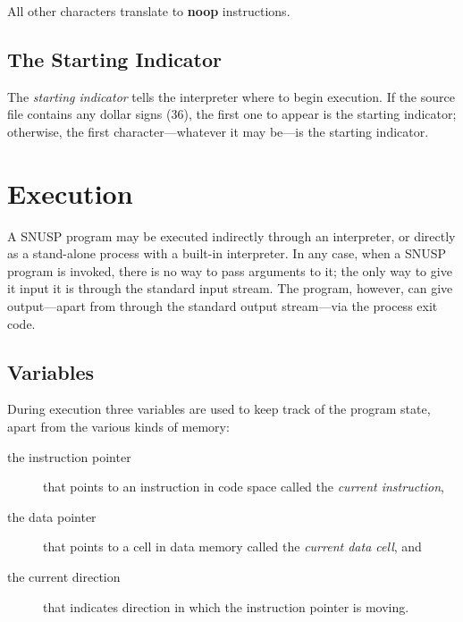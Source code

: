 \documentclass[a4paper]{article}
\begin{document}
All other characters translate to \textbf{noop} instructions.



\subsection{The Starting Indicator}

The \emph{starting indicator} tells the interpreter where to begin execution.
If the source file contains any dollar signs (36), the first one to appear is
the starting indicator; otherwise, the first character---whatever it may
be---is the starting indicator.





\section{Execution}

A \textsc{SNUSP} program may be executed indirectly through an interpreter, or
directly as a stand-alone process with a built-in interpreter.  In any case,
when a \textsc{SNUSP} program is invoked, there is no way to pass arguments to
it; the only way to give it input it is through the standard input stream.
The program, however, can give output---apart from through the standard output
stream---via the process exit code.



\subsection{Variables}

During execution three variables are used to keep track of the program state,
apart from the various kinds of memory:

\begin{description}

\item[the instruction pointer] that points to an instruction in code space
called the \emph{current instruction},

\item[the data pointer] that points to a cell in data memory called the
\emph{current data cell}, and

\item[the current direction] that indicates direction in which the instruction
pointer is moving.

\end{description}
\end{document}
